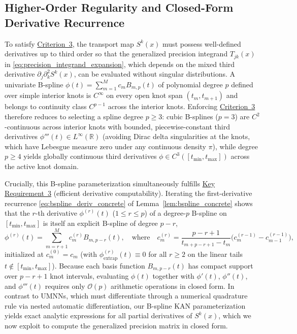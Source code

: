 \documentclass[11pt,a4paper]{article}
\theoremstyle{plain}
\theoremstyle{definition}
\theoremstyle{remark}
\begin{document}
\subsection{Higher-Order Regularity and Closed-Form Derivative Recurrence}
\label{subsec:regularity_and_derivatives}

To satisfy \hyperref[crit:c3_smoothness]{Criterion~3}, the transport map $S^k(x)$ must possess well-defined derivatives up to third order so that the generalized precision integrand $T_{jk}(x)$ in \eqref{eq:precision_integrand_expansion}, which depends on the mixed third derivative $\partial_j \partial_k^2 S^k(x)$, can be evaluated without singular distributions. A univariate B-spline $\phi(t) = \sum_{m=1}^M c_m B_{m, p}(t)$ of polynomial degree $p$ defined over simple interior knots is $C^\infty$ on every open knot span $(t_m, t_{m+1})$ and belongs to continuity class $C^{p-1}$ across the interior knots. Enforcing \hyperref[crit:c3_smoothness]{Criterion~3} therefore reduces to selecting a spline degree $p \ge 3$: cubic B-splines ($p = 3$) are $C^2$-continuous across interior knots with bounded, piecewise-constant third derivatives $\phi'''(t) \in L^\infty(\mathbb{R})$ (avoiding Dirac delta singularities at the knots, which have Lebesgue measure zero under any continuous density $\pi$), while degree $p \ge 4$ yields globally continuous third derivatives $\phi \in C^3([t_{\min}, t_{\max}])$ across the active knot domain.

Crucially, this B-spline parameterization simultaneously fulfills \hyperref[req:key_requirement_3]{Key Requirement~3} (efficient derivative computability). Iterating the first-derivative recurrence \eqref{eq:bspline_deriv_concrete} of Lemma~\ref{lem:bspline_concrete} shows that the $r$-th derivative $\phi^{(r)}(t)$ ($1 \le r \le p$) of a degree-$p$ B-spline on $[t_{\min}, t_{\max}]$ is itself an explicit B-spline of degree $p - r$,
\begin{equation}
    \phi^{(r)}(t) = \sum_{m=r+1}^M c_m^{(r)} B_{m, p-r}(t), \quad \text{where} \quad c_m^{(r)} = \frac{p - r + 1}{t_{m+p-r+1} - t_m}\Big( c_m^{(r-1)} - c_{m-1}^{(r-1)} \Big),
    \label{eq:higher_order_bspline_recurrence}
\end{equation}
initialized at $c_m^{(0)} = c_m$ (with $\phi^{(r)}_{\text{extrap}}(t) \equiv 0$ for all $r \ge 2$ on the linear tails $t \notin [t_{\min}, t_{\max}]$). Because each basis function $B_{m, p-r}(t)$ has compact support over $p - r + 1$ knot intervals, evaluating $\phi(t)$ together with $\phi'(t)$, $\phi''(t)$, and $\phi'''(t)$ requires only $\mathcal{O}(p)$ arithmetic operations in closed form. In contrast to UMNNs, which must differentiate through a numerical quadrature rule via nested automatic differentiation, our B-spline KAN parameterization yields exact analytic expressions for all partial derivatives of $S^k(x)$, which we now exploit to compute the generalized precision matrix in closed form.
\end{document}
